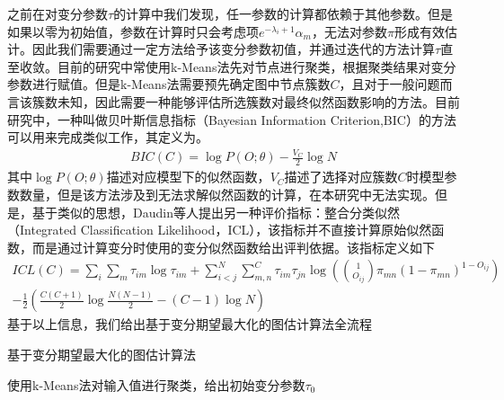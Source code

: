 之前在对变分参数$\tau$的计算中我们发现，任一参数的计算都依赖于其他参数。但是如果以零为初始值，参数在计算时只会考虑项$e^{-\lambda_i+1}\alpha_m$，无法对参数$\pi$形成有效估计。因此我们需要通过一定方法给予该变分参数初值，并通过迭代的方法计算$\tau$直至收敛。目前的研究中常使用k-Means法\cite{haj_estimation_2020}先对节点进行聚类，根据聚类结果对变分参数进行赋值。但是k-Means法需要预先确定图中节点簇数$C$，且对于一般问题而言该簇数未知，因此需要一种能够评估所选簇数对最终似然函数影响的方法。目前研究中，一种叫做贝叶斯信息指标（Bayesian Information Criterion,BIC）\cite{schwarz_estimating_1978}的方法可以用来完成类似工作，其定义为。
\begin{equation}\begin{aligned}
    BIC(C)=\log P(O;\theta)-\frac{V_C}{2}\log N
\end{aligned}\end{equation}
其中$\log P(O;\theta)$描述对应模型下的似然函数，$V_C$描述了选择对应簇数$C$时模型参数数量，但是该方法涉及到无法求解似然函数的计算，在本研究中无法实现。但是，基于类似的思想，Daudin等人提出另一种评价指标：整合分类似然（Integrated Classification Likelihood，ICL）\cite{daudin_mixture_2008}，该指标并不直接计算原始似然函数，而是通过计算变分时使用的变分似然函数给出评判依据。该指标定义如下
\begin{equation}\begin{aligned}
ICL(C)=\sum_i\sum_m\tau_{im} \log \tau_{im} +\sum_{i<j}^N\sum_{m,n}^C\tau_{im}\tau_{jn}\log ( \binom{1}{O_{ij}}\pi_{mn}(1-\pi_{mn})^{1-O_{ij}})\\-\frac{1}{2}(\frac{C(C+1)}{2}\log \frac{N(N-1)}{2}-(C-1)\log N)
\end{aligned}\end{equation}
基于以上信息，我们给出基于变分期望最大化的图估计算法全流程
\begin{algorithm}
\SetAlgoLined
\caption{基于变分期望最大化的图估计算法}

使用k-Means法对输入值进行聚类，给出初始变分参数$\tau_0$


\end{algorithm}


